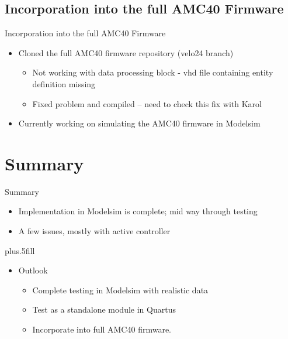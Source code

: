 \documentclass{beamer}
\begin{document}
\subsection{Incorporation into the full AMC40 Firmware}

\begin{frame}{Incorporation into the full AMC40 Firmware}
  \begin{itemize}
    \item
      Cloned the full AMC40 firmware repository (velo24 branch)
      \begin{itemize}
        \item
          Not working with data processing block - vhd file containing entity definition missing
        \item
          Fixed problem and compiled -- need to check this fix with Karol
      \end{itemize}
    \item
      Currently working on simulating the AMC40 firmware in Modelsim
    \end{itemize}
\end{frame}



\section*{Summary}

\begin{frame}{Summary}

  \begin{itemize}
  \item
    Implementation in Modelsim is complete; mid way through testing
  \item
    A few issues, mostly with active controller
  \end{itemize}

  \vskip0pt plus.5fill
  \begin{itemize}
  \item
    Outlook
    \begin{itemize}
    \item
      Complete testing in Modelsim with realistic data
    \item
      Test as a standalone module in Quartus
    \item
      Incorporate into full AMC40 firmware.
    \end{itemize}
  \end{itemize}
\end{frame}
\end{document}
